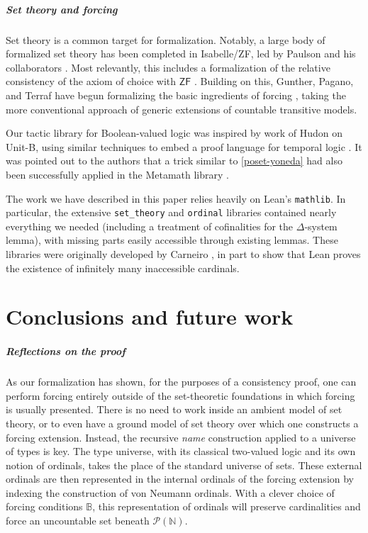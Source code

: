 \documentclass[a4paper,USenglish,cleveref, autoref]{lipics-v2019}
\newcommand{\B}{\mathbb{B}}
\newcommand{\N}{\mathbb{N}}
\theoremstyle{theorem}
\theoremstyle{definition}
\begin{document}
\subparagraph{Set theory and forcing}
Set theory is a common target for formalization. Notably, a large body of formalized set theory has been completed in Isabelle/ZF, led by Paulson and his collaborators \cite{paulson1996mechanizing, paulson1993set, paulson2002reflection}. Most relevantly, this includes a formalization of the relative consistency of the axiom of choice with $\mathsf{ZF}$ \cite{paulson2003relative}. Building on this, Gunther, Pagano, and Terraf have begun formalizing the basic ingredients of forcing \cite{gunther2018first, gunther2019mechanization}, taking the more conventional approach of generic extensions of countable transitive models.

Our tactic library for Boolean-valued logic was inspired by work of Hudon \cite{Hudon2015TheUM} on Unit-B, using similar techniques to embed a proof language for temporal logic \cite{unitb}. It was pointed out to the authors that a trick similar to \autoref{poset-yoneda} had also been successfully applied in the Metamath library \cite{mario2}.

The work we have described in this paper relies heavily on Lean's \lstinline{mathlib}. In particular, the extensive \lstinline{set_theory} and \lstinline{ordinal} libraries contained nearly everything we needed (including a treatment of cofinalities for the $\Delta$-system lemma), with missing parts easily accessible through existing lemmas. These libraries were originally developed by Carneiro \cite{mario1}, in part to show that Lean proves the existence of infinitely many inaccessible cardinals.

\section{Conclusions and future work}
\subparagraph*{Reflections on the proof}
As our formalization has shown, for the purposes of a consistency proof, one can perform forcing entirely outside of the set-theoretic foundations in which forcing is usually presented. There is no need to work inside an ambient model of set theory, or to even have a ground model of set theory over which one constructs a forcing extension. Instead, the recursive \emph{name} construction applied to a universe of types is key. The type universe, with its classical two-valued logic and its own notion of ordinals, takes the place of the standard universe of sets. These external ordinals are then represented in the internal ordinals of the forcing extension by indexing the construction of von Neumann ordinals. With a clever choice of forcing conditions $\B$, this representation of ordinals will preserve cardinalities and force an uncountable set beneath $\mathcal{P}(\N)$.
\end{document}
